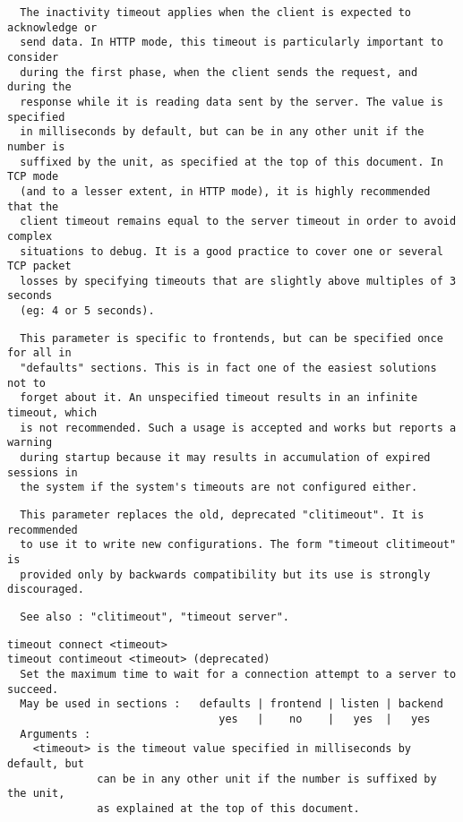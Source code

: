 \begin{verbatim}
  The inactivity timeout applies when the client is expected to acknowledge or
  send data. In HTTP mode, this timeout is particularly important to consider
  during the first phase, when the client sends the request, and during the
  response while it is reading data sent by the server. The value is specified
  in milliseconds by default, but can be in any other unit if the number is
  suffixed by the unit, as specified at the top of this document. In TCP mode
  (and to a lesser extent, in HTTP mode), it is highly recommended that the
  client timeout remains equal to the server timeout in order to avoid complex
  situations to debug. It is a good practice to cover one or several TCP packet
  losses by specifying timeouts that are slightly above multiples of 3 seconds
  (eg: 4 or 5 seconds).
\end{verbatim}

\begin{verbatim}
  This parameter is specific to frontends, but can be specified once for all in
  "defaults" sections. This is in fact one of the easiest solutions not to
  forget about it. An unspecified timeout results in an infinite timeout, which
  is not recommended. Such a usage is accepted and works but reports a warning
  during startup because it may results in accumulation of expired sessions in
  the system if the system's timeouts are not configured either.
\end{verbatim}

\begin{verbatim}
  This parameter replaces the old, deprecated "clitimeout". It is recommended
  to use it to write new configurations. The form "timeout clitimeout" is
  provided only by backwards compatibility but its use is strongly discouraged.
\end{verbatim}

\begin{verbatim}
  See also : "clitimeout", "timeout server".
\end{verbatim}

\begin{verbatim}
timeout connect <timeout>
timeout contimeout <timeout> (deprecated)
  Set the maximum time to wait for a connection attempt to a server to succeed.
  May be used in sections :   defaults | frontend | listen | backend
                                 yes   |    no    |   yes  |   yes
  Arguments :
    <timeout> is the timeout value specified in milliseconds by default, but
              can be in any other unit if the number is suffixed by the unit,
              as explained at the top of this document.
\end{verbatim}

